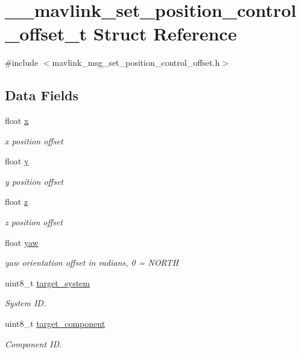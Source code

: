 \hypertarget{struct____mavlink__set__position__control__offset__t}{\section{\+\_\+\+\_\+mavlink\+\_\+set\+\_\+position\+\_\+control\+\_\+offset\+\_\+t Struct Reference}
\label{struct____mavlink__set__position__control__offset__t}
}


{\ttfamily \#include $<$mavlink\+\_\+msg\+\_\+set\+\_\+position\+\_\+control\+\_\+offset.\+h$>$}

\subsection*{Data Fields}
\begin{DoxyCompactItemize}
\item 
float \hyperlink{struct____mavlink__set__position__control__offset__t_a6ae9309c8c66297b1338d78404585666}{x}
\begin{DoxyCompactList}\small\item\em x position offset \end{DoxyCompactList}\item 
float \hyperlink{struct____mavlink__set__position__control__offset__t_a145d089a4a3ef318e6ef7081d3ac4e40}{y}
\begin{DoxyCompactList}\small\item\em y position offset \end{DoxyCompactList}\item 
float \hyperlink{struct____mavlink__set__position__control__offset__t_a626250e1e23229f2770cfcd681aaa043}{z}
\begin{DoxyCompactList}\small\item\em z position offset \end{DoxyCompactList}\item 
float \hyperlink{struct____mavlink__set__position__control__offset__t_ab45aaffab3bdc068c90707367c40643a}{yaw}
\begin{DoxyCompactList}\small\item\em yaw orientation offset in radians, 0 = N\+O\+R\+T\+H \end{DoxyCompactList}\item 
uint8\+\_\+t \hyperlink{struct____mavlink__set__position__control__offset__t_a63112c0a30e2efb13f05d46b70b82a58}{target\+\_\+system}
\begin{DoxyCompactList}\small\item\em System I\+D. \end{DoxyCompactList}\item 
uint8\+\_\+t \hyperlink{struct____mavlink__set__position__control__offset__t_a6ddf48ad9dc6da270c44da926e58d81e}{target\+\_\+component}
\begin{DoxyCompactList}\small\item\em Component I\+D. \end{DoxyCompactList}\end{DoxyCompactItemize}


